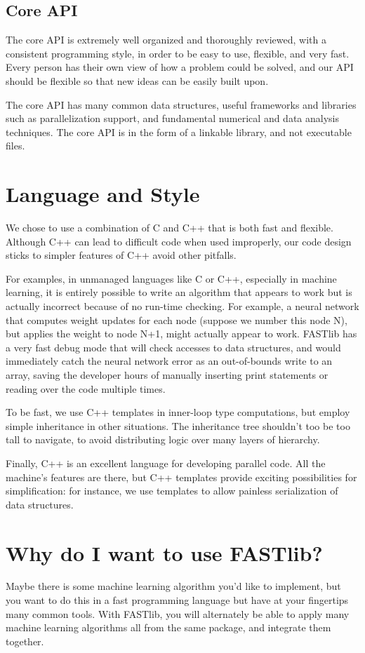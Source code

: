 \documentclass[letter]{report}
\begin{document}
\subsection {Core API} 
The core API is extremely well organized and thoroughly reviewed, with a consistent programming style, in order to be easy to use, flexible, and very fast. Every person has their own view of how a problem could be solved, and our API should be flexible so that new ideas can be easily built upon. 

The core API has many common data structures, useful frameworks and libraries such as parallelization support, and fundamental numerical and data analysis techniques. The core API is in the form of a linkable library, and not executable files. 

\section {Language and Style} 
We chose to use a combination of C and C++ that is both fast and flexible. Although C++ can lead to difficult code when used improperly, our code design sticks to simpler features of C++ avoid other pitfalls. 

For examples, in unmanaged languages like C or C++, especially in machine learning, it is entirely possible to write an algorithm that appears to work but is actually incorrect because of no run-time checking. For example, a neural network that computes weight updates for each node (suppose we number this node N), but applies the weight to node N+1, might actually appear to work. FASTlib has a very fast debug mode that will check accesses to data structures, and would immediately catch the neural network error as an out-of-bounds write to an array, saving the developer hours of manually inserting print statements or reading over the code multiple times. 

To be fast, we use C++ templates in inner-loop type computations, but employ simple inheritance in other situations. The inheritance tree shouldn’t too be too tall to navigate, to avoid distributing logic over many layers of hierarchy. 

Finally, C++ is an excellent language for developing parallel code. All the machine's features are there, but C++ templates provide exciting possibilities for simplification: for instance, we use templates to allow painless serialization of data structures. 

\section{Why do I want to use FASTlib?} 
Maybe there is some machine learning algorithm you'd like to implement, but you want to do this in a fast programming language but have at your fingertips many common tools. With FASTlib, you will alternately be able to apply many machine learning algorithms all from the same package, and integrate them together. 
\end{document}
